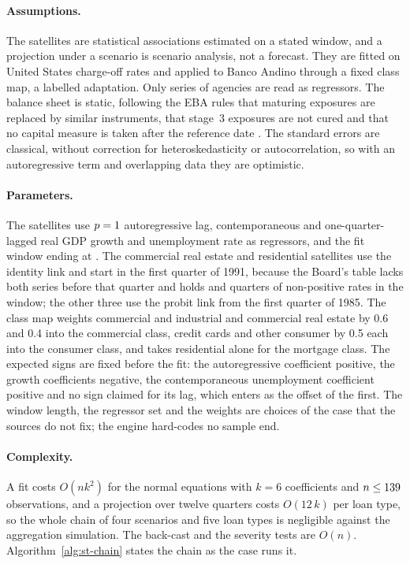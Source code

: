\paragraph{Assumptions.}
The satellites are statistical associations estimated on a stated window, and a projection under a scenario is scenario
analysis, not a forecast. They are fitted on United States charge-off rates and applied to Banco Andino through a fixed class
map, a labelled adaptation. Only series of agencies are read as regressors. The balance sheet is static, following the EBA
rules that maturing exposures are replaced by similar instruments, that stage~3 exposures are not cured and that no capital
measure is taken after the reference date \citep{aggregation-stress:ebanote2025}. The standard errors are classical, without
correction for heteroskedasticity or autocorrelation, so with an autoregressive term and overlapping data they are optimistic.

\paragraph{Parameters.}
The satellites use $p=1$ autoregressive lag, contemporaneous and one-quarter-lagged real GDP growth and
unemployment rate as regressors, and the fit window ending at \agstSatFitEnd. The commercial real estate and residential
satellites use the identity link and start in the first quarter of 1991, because the Board's table lacks both series before that
quarter and holds {\agstNonPosCre} and {\agstNonPosRes} quarters of non-positive rates in the window; the other three use the
probit link from the first quarter of 1985. The class map weights commercial and industrial and commercial real estate by 0.6
and 0.4 into the commercial class, credit cards and other consumer by 0.5 each into the consumer class, and takes residential
alone for the mortgage class. The expected signs are fixed before the fit: the autoregressive coefficient positive, the
growth coefficients negative, the contemporaneous unemployment coefficient positive and no sign claimed for its lag, which enters
as the offset of the first. The window length, the regressor set and the weights are choices of the case that the sources do not
fix; the engine hard-codes no sample end.

\paragraph{Complexity.}
A fit costs $O(nk^{2})$ for the normal equations with $k=6$ coefficients and $n\le139$ observations, and a projection
over twelve quarters costs $O(12\,k)$ per loan type, so the whole chain of four scenarios and five loan types is negligible
against the aggregation simulation. The back-cast and the severity tests are $O(n)$. Algorithm~\ref{alg:st-chain} states the chain as
the case runs it.

